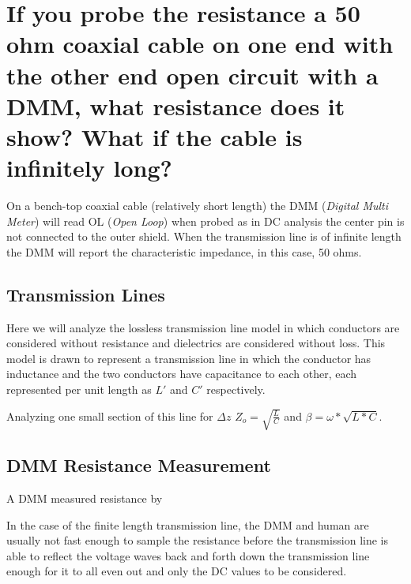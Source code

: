 \documentclass[main.tex]{subfiles}
\begin{document}
\section{If you probe the resistance a 50 ohm coaxial cable on one end with the other end open circuit with a DMM, what resistance does it show? What if the cable is infinitely long?}

\spoilerline


\noindent On a bench-top coaxial cable (relatively short length) the DMM (\textit{Digital Multi Meter}) will read OL (\textit{Open Loop}) when probed as in DC analysis the center pin is not connected to the outer shield. When the transmission line is of infinite length the DMM will report the characteristic impedance, in this case, 50 ohms.

\subsection{Transmission Lines}
Here we will analyze the lossless transmission line model in which conductors are considered without resistance and dielectrics are considered without loss. This model is drawn to represent a transmission line in which the conductor has inductance and the two conductors have capacitance to each other, each represented per unit length as $L\prime$ and $C\prime$ respectively.


Analyzing one small section of this line for $\Delta z$ 
$Z_o = \sqrt{\frac{L}{C}}$ and $\beta = \omega * \sqrt{L*C}$.

\subsection{DMM Resistance Measurement}
A DMM measured resistance by 

In the case of the finite length transmission line, the DMM and human are usually not fast enough to sample the resistance before the transmission line is able to reflect the voltage waves back and forth down the transmission line enough for it to all even out and only the DC values to be considered.
\end{document}
